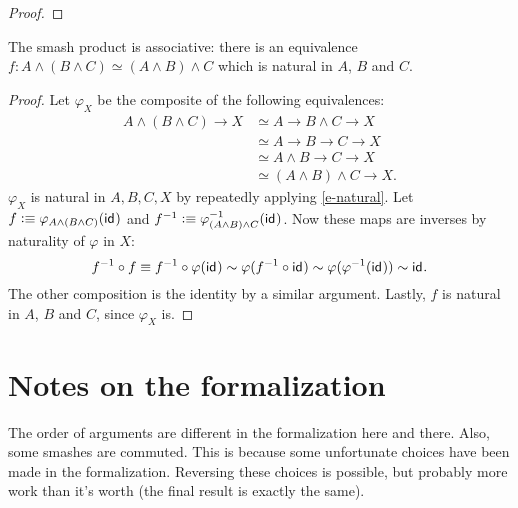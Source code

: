 \documentclass{article}
\renewcommand{\smash}{\wedge}
\renewcommand{\phi}{\varphi}
\renewcommand{\o}{\ensuremath{\circ}}
\newcommand{\sy}{^{-1}}
\begin{document}
\begin{proof}
\end{proof}

\begin{thm}
  The smash product is associative: there is an equivalence $f : A \smash (B \smash C) \simeq (A \smash B) \smash C$ which is natural in $A$, $B$ and $C$.
\end{thm}
\begin{proof}
  Let $\phi_X$ be the composite of the following equivalences:
  \begin{align*}
    A \smash (B \smash C)\to X&\simeq A \to B\smash C\to X\\
    &\simeq A \to B\to C\to X\\
    &\simeq A \smash B\to C\to X\\
    &\simeq (A \smash B)\smash C\to X.                              
  \end{align*}
  $\phi_X$ is natural in $A,B,C,X$ by repeatedly applying \autoref{e-natural}. Let
  $f\defeq\phi_{A \smash (B \smash C)}(\idfunc)$ and
  $f\sy\defeq\phi\sy_{(A \smash B) \smash C}(\idfunc)$. Now these maps are inverses by naturality of
  $\phi$ in $X$:
  $$f\sy\o f\equiv f\sy\o \phi(\idfunc)\sim \phi(f\sy\o\idfunc)\sim \phi(\phi\sy(\idfunc))\sim\idfunc.$$
  The other composition is the identity by a similar argument. Lastly, $f$ is natural in $A$, $B$
  and $C$, since $\phi_X$ is.
\end{proof}

\section{Notes on the formalization}

The order of arguments are different in the formalization here and there.
Also, some smashes are commuted. This is because some unfortunate choices have been made in the formalization. Reversing these choices is possible, but probably more work than it's worth (the final result is exactly the same).
\end{document}

